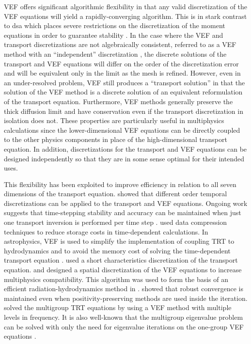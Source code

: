 \documentclass[../doc.tex]{subfiles}
\begin{document}
VEF offers significant algorithmic flexibility in that any valid discretization of the VEF equations will yield a rapidly-converging algorithm. This is in stark contrast to \gls{dsa} which places severe restrictions on the discretization of the moment equations in order to guarantee stability \cite{A}. In the case where the VEF and transport discretizations are not algebraically consistent, referred to as a VEF method with an ``independent'' discretization \cite{doi:10.1080/00411459308203810,two-level-independent-warsa}, the discrete solutions of the transport and VEF equations will differ on the order of the discretization error and will be equivalent only in the limit as the mesh is refined. However, even in an under-resolved problem, VEF still produces a ``transport solution'' in that the solution of the VEF method is a discrete solution of an equivalent reformulation of the transport equation. Furthermore, VEF methods generally preserve the thick diffusion limit \cite{diflim} and have conservation even if the transport discretization in isolation does not. These properties are particularly useful in multiphysics calculations since the lower-dimensional VEF equations can be directly coupled to the other physics components in place of the high-dimensional transport equation. In addition, discretizations for the transport and VEF equations can be designed independently so that they are in some sense optimal for their intended uses. 

This flexibility has been exploited to improve efficiency in relation to all seven dimensions of the transport equation. 
\textcite{GHASSEMI2020109315} showed that different order temporal discretizations can be applied to the transport and VEF equations. Ongoing work suggests that time-stepping stability and accuracy can be maintained when just one transport inversion is performed per time step \cite{yee_mc21}. \textcite{anistratov2021implicit} used data compression techniques to reduce storage costs in time-dependent calculations. In astrophysics, VEF is used to simplify the implementation of coupling TRT to hydrodynamics and to avoid the memory cost of solving the time-dependent transport equation \cite{Jiang_2012,GNEDIN2001437,GEHMEYR1994320}. 
\textcite{Davis_2012} used a short characteristics discretization of the transport equation. \textcite{me} and \textcite{LOU2019258} designed a spatial discretization of the VEF equations to increase multiphysics compatibility. This algorithm was used to form the basis of an efficient radiation-hydrodynamics method in \cite{LOU2021110393}. \textcite{YEE2020109696} showed that robust convergence is maintained even when positivity-preserving methods are used inside the iteration. 
\textcite{ANISTRATOV2019186} solved the multigroup TRT equations by using a VEF method with multiple levels in frequency. It is also well-known that the multigroup eigenvalue problem can be solved with only the need for eigenvalue iterations on the one-group VEF equations \cite{AL}. 
\end{document}
